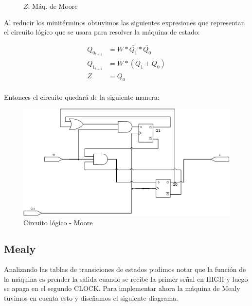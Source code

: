 \documentclass[10pt,a4paper]{article}
\begin{document}
\begin{figure}[H]
	\begin{center}
		\begin{KarnaughquatreTP3}
		\end{KarnaughquatreTP3}
	\end{center}
	\caption{$Z$: Máq. de Moore} 
	\label{3_fig5}
\end{figure}



Al reducir los minitérminos obtuvimos las siguientes expresiones que representan el circuito lógico que se usara para resolver la máquina de estado:

\begin{align*}
	Q_{0_{t+1}} &= W * \overline{Q_{1}} * \overline{Q_{0}}\\
	Q_{1_{t+1}} &= W * (Q_{1} + Q_{0})  \\
	Z &= Q_{0} \\
\end{align*}


Entonces el circuito quedará de la siguiente manera:

\begin{figure}[hbtp]
	\centering
	\includegraphics[scale=1]{Imagenes/circej3.png}
	\caption{Circuito lógico - Moore}
	\label{3_fig6}
\end{figure}


\subsection{Mealy}
Analizando las tablas de transiciones de estados pudimos notar que la función de la máquina es prender la salida cuando se recibe la primer señal en HIGH y luego se apaga en el segundo CLOCK. Para implementar ahora la máquina de Mealy tuvimos en cuenta esto y diseñamos el siguiente diagrama.
\end{document}
